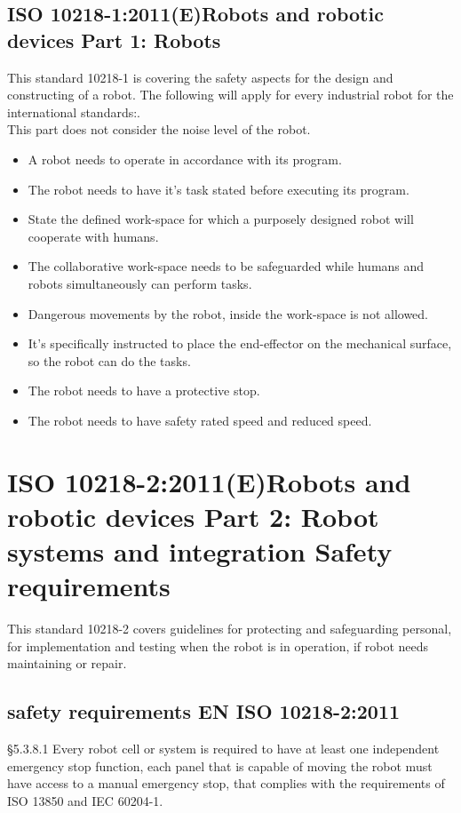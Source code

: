 \subsection{ISO 10218-1:2011(E)Robots and robotic devices Part 1: Robots}
This standard 10218-1 is covering the safety aspects for the design and constructing of a robot.
The following will apply for every industrial robot for the international standards:\cite{Robotterdel1ds}.\\
This part does not consider the noise level of the robot.
\begin{itemize}
    \item A robot needs to operate in accordance with its program.
    \item The robot needs to have it's task stated before executing its program.
    \item State the defined work-space for which a purposely designed robot will cooperate with humans.
    \item The collaborative work-space needs to be safeguarded while humans and robots simultaneously can perform tasks.
    \item Dangerous movements by the robot, inside the work-space is not allowed.
    \item It's specifically instructed to place the end-effector on the mechanical surface, so the robot can do the tasks.
    \item The robot needs to have a protective stop.
    \item The robot needs to have safety rated speed and reduced speed.
\end{itemize}

\section{ISO 10218-2:2011(E)Robots and robotic devices Part 2: Robot systems and integration Safety requirements}\label{ISO2}
This standard 10218-2 covers guidelines for protecting and safeguarding personal, for implementation and testing when the robot is in operation, if robot needs maintaining or repair.

\subsection{safety requirements EN ISO 10218-2:2011}

\S5.3.8.1 Every robot cell or system is required to have at least one independent emergency stop function, each panel that is capable of moving the robot must have access to a manual emergency stop, that complies with the requirements of ISO 13850 and IEC 60204-1.\\ 

